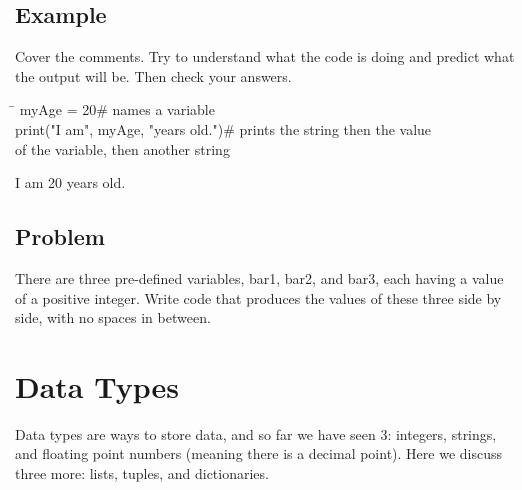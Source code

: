 \documentclass{article}
\newenvironment{code}{\begin{tcolorbox}\ttfamily}{\end{tcolorbox}}
\newenvironment{out}{\begin{tcolorbox}[colback=output]\ttfamily}{\end{tcolorbox}}
\begin{document}
\subsection{Example}
\noindent Cover the comments. Try to understand what the code is doing and predict what the output will be. Then check your answers.
\vspace{1 mm}
\begin{tcolorbox}
	\ttfamily
	\begin{tabbing}
		\hspace{3.25 in}\=\hspace{3.25 in} \kill
		myAge = 20\>\# names a variable\\
		print("I am", myAge, "years old.")\>\# prints the string then the value \\
		\>\hspace{4 pt} of the variable, then another string
	\end{tabbing}
\end{tcolorbox}
\begin{tcolorbox}[colback=output]
	\ttfamily I am 20 years old.
\end{tcolorbox}
\subsection{Problem}
\noindent There are three pre-defined variables, bar1, bar2, and bar3, each having a value of a positive integer. Write code that produces the values of these three side by side, with no spaces in between.
\vspace{1 mm}
\begin{code}
\vspace{1.5 cm}
\end{code}
\begin{out}
378393
\end{out}
\section{Data Types}
Data types are ways to store data, and so far we have seen 3: integers, strings, and floating point numbers (meaning there is a decimal point). Here we discuss three more: lists, tuples, and dictionaries.
\end{document}
